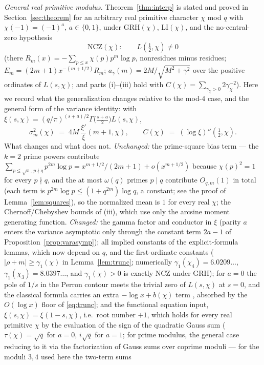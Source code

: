 \documentclass[11pt]{article}
\begin{document}
\emph{General real primitive modulus.} Theorem~\ref{thm:interp} is
stated and proved in Section~\ref{sec:theorem} for an arbitrary real
primitive character $\chi$ mod $q$ with
$\chi(-1)=(-1)^a$, $a\in\{0,1\}$, under GRH$(\chi)$, LI$(\chi)$,
and the no-central-zero hypothesis
\[
\mathrm{NCZ}(\chi):\qquad L(\tfrac12,\chi)\neq0
\]
(there $R_m(x)=-\sum_{p\le x}\chi(p)p^m\log p$, nonresidues minus
residues; $E_m=(2m+1)x^{-(m+1/2)}R_m$;
$a_\gamma(m)=2M/\sqrt{M^2+\gamma^2}$ over the positive ordinates of
$L(s,\chi)$; and parts (i)--(iii) hold with
$C(\chi)=\sum_{\gamma_\chi>0}2\gamma_\chi^{-2}$). Here we record what
the generalization changes relative to the mod-$4$ case, and the
general form of the variance identity: with
$\xi(s,\chi)=(q/\pi)^{(s+a)/2}\Gamma\bigl(\tfrac{s+a}2\bigr)L(s,\chi)$,
\[
\sigma_m^2(\chi)\;=\;4M\,\frac{\xi'}{\xi}(m+1,\chi),
\qquad
C(\chi)\;=\;(\log\xi)''(\tfrac12,\chi).
\]
What changes and what does not. \emph{Unchanged:} the prime-square bias
term --- the $k=2$ prime powers contribute
$\sum_{p\le\sqrt x,\,p\nmid q}p^{2m}\log p=x^{m+1/2}/(2m+1)+o(x^{m+1/2})$
because $\chi(p)^2=1$ for every $p\nmid q$, and the at most $\omega(q)$
primes $p\mid q$
contribute $O_{q,m}(1)$ in total (each term is
$p^{2m}\log p\le(1+q^{2m})\log q$, a constant; see the proof of
Lemma~\ref{lem:squares}), so the normalized mean is $1$ for every
real $\chi$; the Chernoff/Chebyshev bounds of (iii), which use only the
arcsine moment generating function. \emph{Changed:} the gamma factor
and conductor in $\xi$ (parity $a$ enters the variance asymptotic only
through the constant term $2a-1$ of
Proposition~\ref{prop:varasymp}); all implied constants of the
explicit-formula lemmas, which now depend on $q$, and the
first-ordinate constants ($|\rho+m|\ge\gamma_1(\chi)$ in
Lemma~\ref{lem:trunc}; numerically $\gamma_1(\chi_4)=6.0209\ldots$,
$\gamma_1(\chi_3)=8.0397\ldots$, and $\gamma_1(\chi)>0$ is exactly
NCZ under GRH); for $a=0$ the pole of $1/s$ in the Perron contour meets
the trivial zero of $L(s,\chi)$ at $s=0$, and the classical formula
carries an extra $-\log x+b(\chi)$ term \cite[Ch.~19]{Dav00}, absorbed
by the $O(\log x)$ floor of \eqref{eq:trunc}; and the functional
equation input, $\xi(s,\chi)=\xi(1-s,\chi)$, i.e.\ root number $+1$,
which holds for every real primitive $\chi$ by the evaluation of the
sign of the quadratic Gauss sum ($\tau(\chi)=\sqrt q$ for $a=0$,
$i\sqrt q$ for $a=1$; \cite[Ch.~2]{Dav00} for prime modulus, the
general case reducing to it via the factorization of Gauss sums over
coprime moduli --- for the moduli $3,4$ used here the two-term sums
\end{document}
